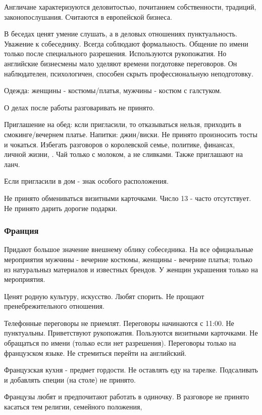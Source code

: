 Англичане характеризуются деловитостью, почитанием собственности, традиций, законопослушания. Считаются \missed{} в европейской \missed{} бизнеса.

В беседах ценят умение слушать, а в деловых отношениях пунктуальность. Уважение к собеседнику. Всегда соблюдают формальность. Общение по имени только после специального разрешения. Используются рукопожатия. Но английские бизнесмены мало уделяют времени погдотовке переговоров. Он наблюдателен, психологичен, способен скрыть профессиональную неподготовку.

Одежда: женщины - костюмы/платья, мужчины - костюм с галстуком.

О делах после работы разговаривать не принято.

Приглашение на обед: ксли пригласили, то отказываться нельзя, приходить в смокинге/вечернем платье. Напитки: джин/виски. Не принято произносить тосты и чокаться.
Избегать разговоров о королевской семье, политике, финансах, личной жизни, \missed{}.
Чай только с молоком, а не сливками.
Также приглашают на ланч.

Если пригласили в дом - знак особого расположения.

Не принято обмениваться визитными карточками. Число 13 - часто отсутствует. Не принято дарить дорогие подарки.

\subsubsection{Франция}

Придают большое значение внешнему облику собеседника. На все официальные мероприятия мужчины - вечерние костюмы, женщины - вечерние платья; только из натуральныз материалов и известных брендов. У женщин украшения только на мероприятия.

Ценят родную культуру, искусство.
Любят спорить. Не прощают пренебрежительного отношения.

Телефонные переговоры не приемлят. Переговоры начинаются с 11:00. Не пунктуальны. Приветствуют рукопожатия. Пользуются визитными карточками.
Не обращаться по имени (только если нет разрешения). Переговоры только на французском языке.
Не стремиться перейти на английский.

Французская кухня - предмет гордости. Не оставлять еду на тарелке. Подсаливать и добавлять специи (на столе) не принято.

Французы любят и предпочитают работать в одиночку. В разговоре не принято касаться тем религии, семейного положения, \missed{}

